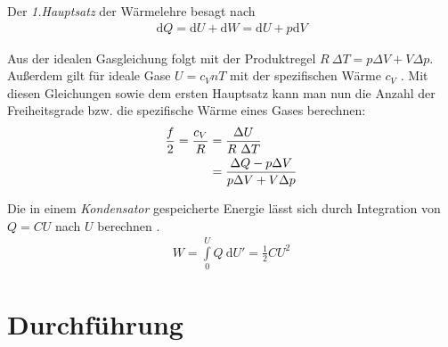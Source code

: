 \documentclass[12pt,a4paper,titlepage,headinclude,bibtotoc]{scrartcl}
\newcommand{\dif}{\ensuremath{\mathrm{d}}}
\begin{document}
Der \textit{1.Hauptsatz} der Wärmelehre besagt nach \cite[S.262f.]{gerthsen}
\begin{align}
	\dif Q = \dif U+\dif W = \dif U+p\dif V \label{eq:1HS}
\end{align}

Aus der idealen Gasgleichung  folgt mit der Produktregel $R~\Delta T = p\Delta V+ V\Delta p$. Außerdem gilt für ideale Gase $U=c_VnT$ mit der spezifischen Wärme $c_V$ \cite[S.263]{gerthsen}.
Mit diesen Gleichungen sowie dem ersten Hauptsatz kann man nun die Anzahl der Freiheitsgrade bzw. die spezifische Wärme eines Gases berechnen:
\begin{align}
\frac{f}{2}=\frac{c_V}{R}
          &=\frac{\Delta U}{R~\Delta T}\notag\\
          &=\frac{\Delta Q-p\Delta V}{p\Delta V+V\Delta p} \label{eq:fhalbe}
\end{align}

Die in einem \textit{Kondensator} gespeicherte Energie lässt sich  durch Integration von $Q=CU$ nach $U$ berechnen \cite[S.329]{gerthsen}.
\begin{align}
	W=\int \limits_{0}^U Q ~\dif U'=\frac{1}{2}CU^2
	\label{eq:Kondensator}
\end{align}

\section{Durchführung}
\label{sec:durchfuehrung}
\end{document}
